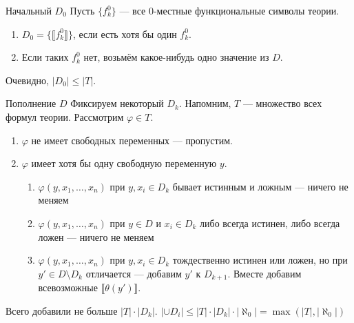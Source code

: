 \documentclass[aspectratio=169]{beamer}
\begin{document}
\begin{frame}{Начальный $D_0$}
Пусть $\{f^0_k\}$ --- все 0-местные функциональные символы теории. \pause
\begin{enumerate}
\item $D_0 = \{ \llbracket f^0_k \rrbracket \}$, если есть хотя бы один $f^0_k$. \pause
\item Если таких $f^0_k$ нет, возьмём какое-нибудь одно значение из $D$. \pause
\end{enumerate}\pause

Очевидно, $|D_0| \le |T|$.
\end{frame}

\begin{frame}{Пополнение $D$}
Фиксируем некоторый $D_k$. Напомним, $T$ --- множество всех формул теории. Рассмотрим $\varphi \in T$.\pause
\begin{enumerate}
\item $\varphi$ не имеет свободных переменных --- пропустим. \pause
\item $\varphi$ имеет хотя бы одну свободную переменную $y$. \pause
\begin{enumerate}
\item $\varphi (y, x_1, \dots, x_n)$ при $y,x_i \in D_k$ бывает истинным и ложным --- ничего не меняем \pause
\item $\varphi (y, x_1, \dots, x_n)$ при $y \in D$ и $x_i \in D_k$ либо всегда истинен, либо всегда ложен --- ничего не меняем \pause
\item $\varphi (y, x_1, \dots, x_n)$ при $y,x_i \in D_k$ тождественно истинен или ложен, но при 
$y' \in D \setminus D_k$ отличается --- добавим $y'$ к $D_{k+1}$. \pause
Вместе добавим всевозможные $\llbracket\theta(y')\rrbracket$.
\end{enumerate}
\end{enumerate}\pause

Всего добавили не больше $|T| \cdot |D_k|$. \pause $|\cup D_i| \le |T| \cdot |D_k| \cdot |\aleph_0| = \max (|T|, |\aleph_0|)$
\end{frame}
\end{document}
